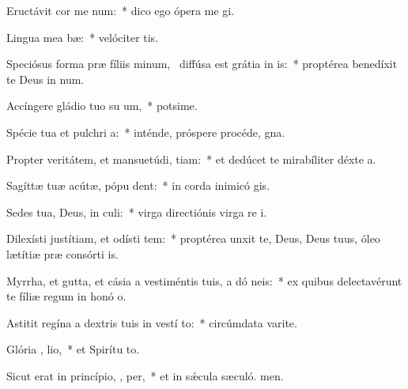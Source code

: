 \item Eructávit cor me  num:~* dico ego ópera me gi.
\item Lingua mea  bæ:~* velóciter tis.
\item Speciósus forma præ fíliis minum,~\pscross{} diffúsa est grátia in  is:~* proptérea benedíxit te Deus in num.
\item Accíngere gládio tuo su  um,~* potsime.
\item Spécie tua et pulchri a:~* inténde, próspere procéde,  gna.
\item Propter veritátem, et mansuetúdi,  tiam:~* et dedúcet te mirabíliter déxte a.
\item Sagíttæ tuæ acútæ, pópu   dent:~* in corda inimicó gis.
\item Sedes tua, Deus, in  culi:~* virga directiónis virga re i.
\item Dilexísti justítiam, et odísti tem:~* proptérea unxit te, Deus, Deus tuus, óleo lætítiæ præ consórti is.
\item Myrrha, et gutta, et cásia a vestiméntis tuis, a dó neis:~* ex quibus delectavérunt te fíliæ regum in honó o.
\item Astitit regína a dextris tuis in vestí to:~* circúmdata varite.
\item Glória ,  lio,~* et Spirítu to.
\item Sicut erat in princípio,  ,  per,~* et in sǽcula sæculó. men.
